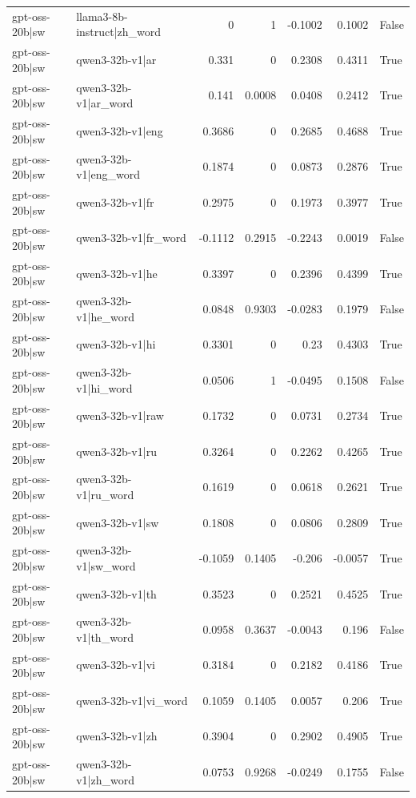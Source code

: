 \begin{table}
\begin{tabular}{l l r r r r l}
gpt-oss-20b|sw & llama3-8b-instruct|zh_word & 0 & 1 & -0.1002 & 0.1002 & False \\
gpt-oss-20b|sw & qwen3-32b-v1|ar & 0.331 & 0 & 0.2308 & 0.4311 & True \\
gpt-oss-20b|sw & qwen3-32b-v1|ar_word & 0.141 & 0.0008 & 0.0408 & 0.2412 & True \\
gpt-oss-20b|sw & qwen3-32b-v1|eng & 0.3686 & 0 & 0.2685 & 0.4688 & True \\
gpt-oss-20b|sw & qwen3-32b-v1|eng_word & 0.1874 & 0 & 0.0873 & 0.2876 & True \\
gpt-oss-20b|sw & qwen3-32b-v1|fr & 0.2975 & 0 & 0.1973 & 0.3977 & True \\
gpt-oss-20b|sw & qwen3-32b-v1|fr_word & -0.1112 & 0.2915 & -0.2243 & 0.0019 & False \\
gpt-oss-20b|sw & qwen3-32b-v1|he & 0.3397 & 0 & 0.2396 & 0.4399 & True \\
gpt-oss-20b|sw & qwen3-32b-v1|he_word & 0.0848 & 0.9303 & -0.0283 & 0.1979 & False \\
gpt-oss-20b|sw & qwen3-32b-v1|hi & 0.3301 & 0 & 0.23 & 0.4303 & True \\
gpt-oss-20b|sw & qwen3-32b-v1|hi_word & 0.0506 & 1 & -0.0495 & 0.1508 & False \\
gpt-oss-20b|sw & qwen3-32b-v1|raw & 0.1732 & 0 & 0.0731 & 0.2734 & True \\
gpt-oss-20b|sw & qwen3-32b-v1|ru & 0.3264 & 0 & 0.2262 & 0.4265 & True \\
gpt-oss-20b|sw & qwen3-32b-v1|ru_word & 0.1619 & 0 & 0.0618 & 0.2621 & True \\
gpt-oss-20b|sw & qwen3-32b-v1|sw & 0.1808 & 0 & 0.0806 & 0.2809 & True \\
gpt-oss-20b|sw & qwen3-32b-v1|sw_word & -0.1059 & 0.1405 & -0.206 & -0.0057 & True \\
gpt-oss-20b|sw & qwen3-32b-v1|th & 0.3523 & 0 & 0.2521 & 0.4525 & True \\
gpt-oss-20b|sw & qwen3-32b-v1|th_word & 0.0958 & 0.3637 & -0.0043 & 0.196 & False \\
gpt-oss-20b|sw & qwen3-32b-v1|vi & 0.3184 & 0 & 0.2182 & 0.4186 & True \\
gpt-oss-20b|sw & qwen3-32b-v1|vi_word & 0.1059 & 0.1405 & 0.0057 & 0.206 & True \\
gpt-oss-20b|sw & qwen3-32b-v1|zh & 0.3904 & 0 & 0.2902 & 0.4905 & True \\
gpt-oss-20b|sw & qwen3-32b-v1|zh_word & 0.0753 & 0.9268 & -0.0249 & 0.1755 & False \\

\end{tabular}
\end{table}
